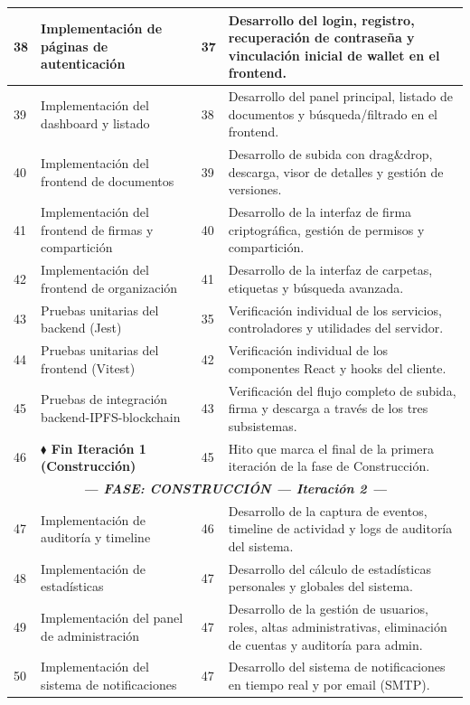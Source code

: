 \documentclass[11pt, a4paper]{article}
\begin{document}
\begin{longtable}{|p{1cm}|p{5.5cm}|p{1.5cm}|p{5.5cm}|}
\hline
38 & Implementación de páginas de autenticación & 37 & Desarrollo del login, registro, recuperación de contraseña y vinculación inicial de wallet en el frontend. \\
\hline
39 & Implementación del dashboard y listado & 38 & Desarrollo del panel principal, listado de documentos y búsqueda/filtrado en el frontend. \\
\hline
40 & Implementación del frontend de documentos & 39 & Desarrollo de subida con drag\&drop, descarga, visor de detalles y gestión de versiones. \\
\hline
41 & Implementación del frontend de firmas y compartición & 40 & Desarrollo de la interfaz de firma criptográfica, gestión de permisos y compartición. \\
\hline
42 & Implementación del frontend de organización & 41 & Desarrollo de la interfaz de carpetas, etiquetas y búsqueda avanzada. \\
\hline
43 & Pruebas unitarias del backend (Jest) & 35 & Verificación individual de los servicios, controladores y utilidades del servidor. \\
\hline
44 & Pruebas unitarias del frontend (Vitest) & 42 & Verificación individual de los componentes React y hooks del cliente. \\
\hline
45 & Pruebas de integración backend-IPFS-blockchain & 43 & Verificación del flujo completo de subida, firma y descarga a través de los tres subsistemas. \\
\hline
46 & \textbf{$\blacklozenge$ Fin Iteración 1 (Construcción)} & 45 & Hito que marca el final de la primera iteración de la fase de Construcción. \\
\hline
\multicolumn{4}{|c|}{\textit{\textbf{--- FASE: CONSTRUCCIÓN --- Iteración 2 ---}}} \\
\hline
47 & Implementación de auditoría y timeline & 46 & Desarrollo de la captura de eventos, timeline de actividad y logs de auditoría del sistema. \\
\hline
48 & Implementación de estadísticas & 47 & Desarrollo del cálculo de estadísticas personales y globales del sistema. \\
\hline
49 & Implementación del panel de administración & 47 & Desarrollo de la gestión de usuarios, roles, altas administrativas, eliminación de cuentas y auditoría para admin. \\
\hline
50 & Implementación del sistema de notificaciones & 47 & Desarrollo del sistema de notificaciones en tiempo real y por email (SMTP). \\

\end{longtable}
\end{document}
